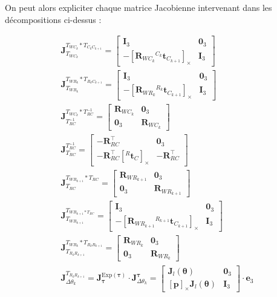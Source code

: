\documentclass[a4paper]{article}
\begin{document}
\noindent On peut alors expliciter chaque matrice Jacobienne intervenant dans les décompositions ci-dessus :

\begin{subequations}
\begin{align}
%
\bm{J}^{T_{WC_{k}} \ast T_{C_kC_{k+1}}}_{T_{WC_k}} =
\begin{bmatrix}
\bm{I}_3 & \bm{0}_3 \\
- \left[ \bm{R}_{WC_k} {}^{C_k}\bm{t}_{C_{k+1}} \right]_{\times} & \bm{I}_3
\end{bmatrix}\\[1em]
%
\bm{J}^{T_{WR_k} \ast T_{R_kC_{k+1}}}_{T_{WR_k}} =
\begin{bmatrix} \bm{I}_3 & \bm{0}_3 \\ - \left[ \bm{R}_{WR_k} {}^{R_k}\bm{t}_{C_{k+1}} \right]_{\times} & \bm{I}_3 \end{bmatrix}\\[1em]
%
\bm{J}^{T_{WC_k} \ast T_{RC}^{-1}}_{T_{RC}^{-1}} =
\begin{bmatrix} \bm{R}_{WC_k} & \bm{0}_3 \\ \bm{0}_3 & \bm{R}_{WC_k} \end{bmatrix}\\[1em]
%
\bm{J}^{T_{RC}^{-1}}_{T_{RC}} =
\begin{bmatrix} - \bm{R}_{RC}^{\top} & \bm{0}_3 \\ - \bm{R}_{RC}^{\top} \left[ {}^{R}\bm{t}_C 
\right]_{\times} & - \bm{R}_{RC}^{\top} \end{bmatrix}\\[1em]
%
\bm{J}^{T_{WR_{k+1}} \ast T_{RC}}_{T_{RC}} =
\begin{bmatrix} \bm{R}_{WR_{k+1}} & \bm{0}_3 \\ \bm{0}_3 & \bm{R}_{WR_{k+1}} \end{bmatrix}\\[1em]
%
\bm{J}^{T_{WR_{k+1} \ast T_{RC}}}_{T_{WR_{k+1}}} =
\begin{bmatrix} \bm{I}_3 & \bm{0}_3 \\ - \left[ \bm{R}_{WR_{k+1}} {}^{R_{k+1}}\bm{t}_{C_{k+1}} \right]_{\times} & \bm{I}_3 \end{bmatrix}\\[1em]
%
\bm{J}^{T_{WR_k} \ast T_{R_kR_{k+1}}}_{T_{R_kR_{k+1}}} =
\begin{bmatrix} \bm{R}_{WR_k} & \bm{0}_3 \\ \bm{0}_3 & \bm{R}_{WR_k} \end{bmatrix}\\[1em]
%
\bm{J}^{T_{R_kR_{k+1}}}_{\Delta\theta_k} = 
\bm{J}^{\text{Exp}(\bm{\tau})}_{\bm{\tau}} \cdot \bm{J}^{\bm{\tau}}_{\Delta\theta_k}
= \begin{bmatrix}
\bm{J}_l(\bm{\theta}) & \bm{0}_3 \\
\left[ \bm{p} \right]_{\times} \bm{J}_l(\bm{\theta}) & \bm{I}_3
\end{bmatrix} \cdot \bm{e}_3
\end{align}
\end{subequations}
\end{document}

